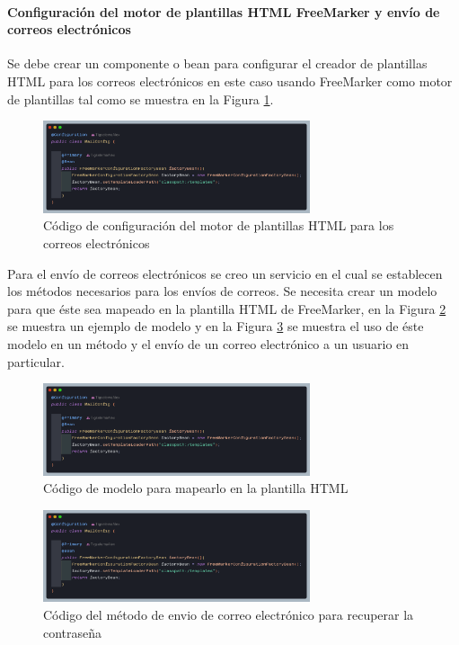 \paragraph{Configuración del motor de plantillas HTML FreeMarker y envío de correos electrónicos}

Se debe crear un componente o bean para configurar el creador de plantillas HTML para los correos electrónicos en este caso usando FreeMarker como motor de plantillas tal como se muestra en la Figura \ref{fig:freemaker}.

\begin{figure}[H]
    \centering
    \includegraphics[width=0.7\textwidth]{resources/images/fremaker}
    \caption{Código de configuración del motor de plantillas HTML para los correos electrónicos}
    \label{fig:freemaker}
\end{figure}

Para el envío de correos electrónicos se creo un servicio en el cual se establecen los métodos necesarios para los envíos de correos.
Se necesita crear un modelo para que éste sea mapeado en la plantilla HTML de FreeMarker, en la Figura \ref{fig:mail-service-model} se muestra un ejemplo de modelo y en la Figura \ref{fig:mail-service-method} se muestra el uso de éste modelo en un método y el envío de un correo electrónico a un usuario en particular.

\begin{figure}[H]
    \centering
    \includegraphics[width=0.7\textwidth]{resources/images/fremaker}
    \caption{Código de modelo para mapearlo en la plantilla HTML}
    \label{fig:mail-service-model}
\end{figure}

\begin{figure}[H]
    \centering
    \includegraphics[width=0.7\textwidth]{resources/images/fremaker}
    \caption{Código del método de envio de correo electrónico para recuperar la contraseña}
    \label{fig:mail-service-method}
\end{figure}

